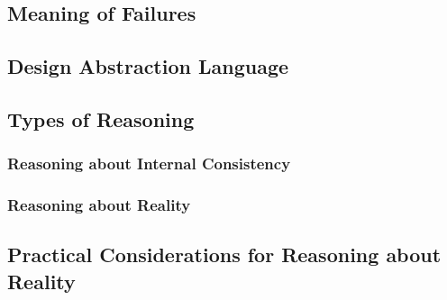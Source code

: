 \subsection{Meaning of Failures}

\subsection{Design Abstraction Language}

\subsection{Types of Reasoning}

\subsubsection{Reasoning about Internal Consistency}

\subsubsection{Reasoning about Reality}

\subsection{Practical Considerations for Reasoning about Reality}
